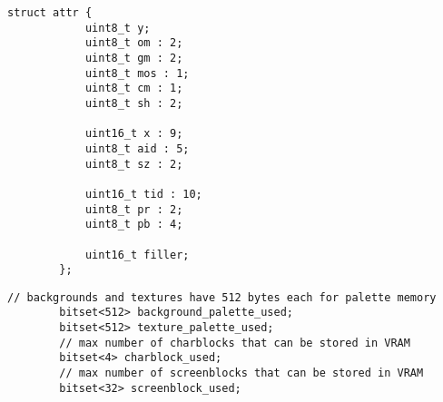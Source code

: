 \begin{itemize}
        \begin{lstlisting}[float,caption={\textit{Struct} com \textit{bitfields} para atributos das texturas.}]
        struct attr {
            uint8_t y;
            uint8_t om : 2;
            uint8_t gm : 2;
            uint8_t mos : 1;
            uint8_t cm : 1;
            uint8_t sh : 2;

            uint16_t x : 9;
            uint8_t aid : 5;
            uint8_t sz : 2;

            uint16_t tid : 10;
            uint8_t pr : 2;
            uint8_t pb : 4;

            uint16_t filler;
        };
        \end{lstlisting}

        \begin{lstlisting}[float,caption={\textit{Bitsets} para checagem de disponibilidade na memória.}]
        // backgrounds and textures have 512 bytes each for palette memory
        bitset<512> background_palette_used;
        bitset<512> texture_palette_used;
        // max number of charblocks that can be stored in VRAM
        bitset<4> charblock_used;
        // max number of screenblocks that can be stored in VRAM
        bitset<32> screenblock_used;
        \end{lstlisting}

    \end{itemize}